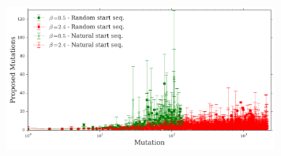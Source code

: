 \documentclass{beamer}
\begin{document}
\begin{frame}
\begin{adjustwidth}{-2.0em}{-2.0em}
\includegraphics[width=340px,height=250px]{../img/iterationVsMutAttempts-mean.png} 
\end{adjustwidth}
\end{frame}









% 
% 
\end{document}
